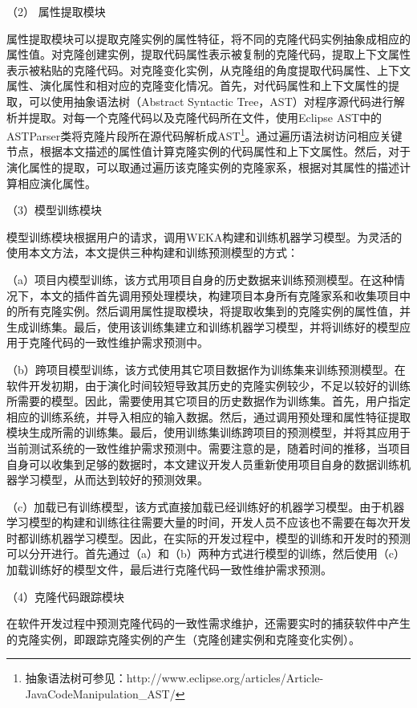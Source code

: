 （2） 属性提取模块

属性提取模块可以提取克隆实例的属性特征，将不同的克隆代码实例抽象成相应的属性值。对克隆创建实例，提取代码属性表示被复制的克隆代码，提取上下文属性表示被粘贴的克隆代码。对克隆变化实例，从克隆组的角度提取代码属性、上下文属性、演化属性和相对应的克隆变化情况。首先，对代码属性和上下文属性的提取，可以使用抽象语法树（Abstract Syntactic Tree，AST）对程序源代码进行解析并提取。对每一个克隆代码以及克隆代码所在文件，使用Eclipse AST中的 ASTParser类将克隆片段所在源代码解析成AST\footnote{抽象语法树可参见：http://www.eclipse.org/articles/Article-JavaCodeManipulation\_AST/}。通过遍历语法树访问相应关键节点，根据本文描述的属性值计算克隆实例的代码属性和上下文属性。然后，对于演化属性的提取，可以取通过遍历该克隆实例的克隆家系，根据对其属性的描述计算相应演化属性。

（3）模型训练模块

模型训练模块根据用户的请求，调用WEKA构建和训练机器学习模型。为灵活的使用本文方法，本文提供三种构建和训练预测模型的方式：

（a）项目内模型训练，该方式用项目自身的历史数据来训练预测模型。在这种情况下，本文的插件首先调用预处理模块，构建项目本身所有克隆家系和收集项目中的所有克隆实例。然后调用属性提取模块，将提取收集到的克隆实例的属性值，并生成训练集。最后，使用该训练集建立和训练机器学习模型，并将训练好的模型应用于克隆代码的一致性维护需求预测中。

（b）跨项目模型训练，该方式使用其它项目数据作为训练集来训练预测模型。在软件开发初期，由于演化时间较短导致其历史的克隆实例较少，不足以较好的训练所需要的模型。因此，需要使用其它项目的历史数据作为训练集。首先，用户指定相应的训练系统，并导入相应的输入数据。然后，通过调用预处理和属性特征提取模块生成所需的训练集。最后，使用训练集训练跨项目的预测模型，并将其应用于当前测试系统的一致性维护需求预测中。需要注意的是，随着时间的推移，当项目自身可以收集到足够的数据时，本文建议开发人员重新使用项目自身的数据训练机器学习模型，从而达到较好的预测效果。

（c）加载已有训练模型，该方式直接加载已经训练好的机器学习模型。由于机器学习模型的构建和训练往往需要大量的时间，开发人员不应该也不需要在每次开发时都训练机器学习模型。因此，在实际的开发过程中，模型的训练和开发时的预测可以分开进行。首先通过（a）和（b）两种方式进行模型的训练，然后使用（c）加载训练好的模型文件，最后进行克隆代码一致性维护需求预测。

（4）克隆代码跟踪模块

在软件开发过程中预测克隆代码的一致性需求维护，还需要实时的捕获软件中产生的克隆实例，即跟踪克隆实例的产生（克隆创建实例和克隆变化实例）。

